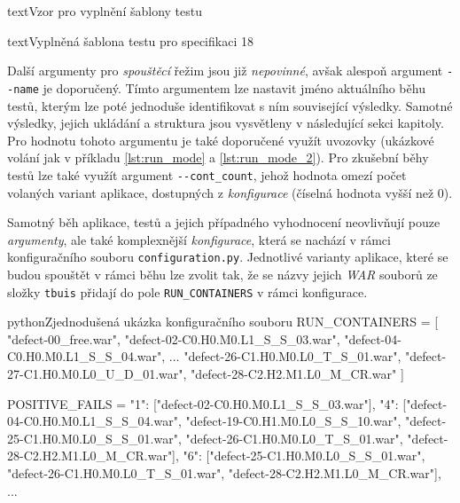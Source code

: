 \documentclass[czech, ma, kiv, he, iso690numb, pdf, viewonly]{fasthesis}
\begin{document}
\begin{code}{text}{Vzor pro vyplnění šablony testu \label{lst:template}}
{\begin{code}{text}{Vyplněná šablona testu pro specifikaci 18 \label{lst:spec18}}
{    Další argumenty pro \textit{spouštěcí} řežim jsou již \emph{nepovinné}, avšak alespoň argument \verb|--name| je doporučený. Tímto argumentem lze nastavit jméno aktuálního běhu testů, kterým lze poté jednoduše identifikovat s ním související výsledky. Samotné výsledky, jejich ukládání a struktura jsou vysvětleny v následující sekci kapitoly. Pro hodnotu tohoto argumentu je také doporučené využít uvozovky (ukázkové volání jak v příkladu \ref{lst:run_mode} a \ref{lst:run_mode_2}). Pro zkušební běhy testů lze také využít argument \verb|--cont_count|, jehož hodnota omezí počet volaných variant aplikace, dostupných z \textit{konfigurace} (číselná hodnota vyšší než \(0\)).

    Samotný běh aplikace, testů a jejich případného vyhodnocení neovlivňují pouze \emph{argumenty}, ale také komplexnější \emph{konfigurace}, která se nachází v rámci konfiguračního souboru \verb|configuration.py|. Jednotlivé varianty aplikace, které se budou spouštět v rámci běhu lze zvolit tak, že se názvy jejich \textit{WAR} souborů ze složky \verb|tbuis| přidají do pole \verb|RUN_CONTAINERS| v rámci konfigurace. 

    \begin{code}{python}{Zjednodušená ukázka konfiguračního souboru \label{lst:configuration}}
RUN_CONTAINERS = [
    "defect-00_free.war",
    "defect-02-C0.H0.M0.L1_S_S_03.war",
    "defect-04-C0.H0.M0.L1_S_S_04.war",
    ...
    "defect-26-C1.H0.M0.L0_T_S_01.war",
    "defect-27-C1.H0.M0.L0_U_D_01.war",
    "defect-28-C2.H2.M1.L0_M_CR.war"
]

POSITIVE_FAILS = {
    "1": ["defect-02-C0.H0.M0.L1_S_S_03.war"],
    "4": ["defect-04-C0.H0.M0.L1_S_S_04.war", "defect-19-C0.H1.M0.L0_S_S_10.war", "defect-25-C1.H0.M0.L0_S_S_01.war", "defect-26-C1.H0.M0.L0_T_S_01.war", "defect-28-C2.H2.M1.L0_M_CR.war"],
    "6": ["defect-25-C1.H0.M0.L0_S_S_01.war", "defect-26-C1.H0.M0.L0_T_S_01.war", "defect-28-C2.H2.M1.L0_M_CR.war"],
    ...
}\end{code}
    
}
\end{code}}
\end{code}
\end{document}
